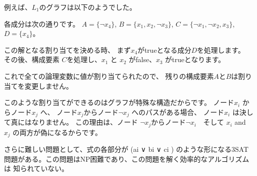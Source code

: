 例えば、$L_1$のグラフは以下のようでした。
\begin{center}
\end{center}

各成分は次の通りです。
$A = \{\lnot x_4\}$,
$B = \{x_1, x_2, \lnot x_3\}$,
$C = \{\lnot x_1, \lnot x_2, x_3\}$,
$D = \{x_4\}$。

この解となる割り当てを決める時、
まず$x_4$がtrueとなる成分$D$を処理します。
その後、構成要素 $C$を処理し、$x_1$ と $x_2$ がfalse、$x_3$ がtrueとなります。

これで全ての論理変数に値が割り当てられたので、
残りの構成要素$A$と$B$は割り当てを変更しません。

このような割り当てができるのはグラフが特殊な構造だからです。
ノード$x_i$  からノード$x_j$  へ、
ノード$x_j$からノード$\lnot x_j$ へのパスがある場合、
ノード$x_i$ は決して真にはなりません。
この理由は、ノード
 $\lnot x_j$からノード$\lnot x_i$　そして $x_i$ and $x_j$  の両方が偽になるからです。


さらに難しい問題として、式の各部分が (ai ∨ bi ∨ ci ) のような形になる3SAT
問題がある。この問題はNP困難であり、この問題を解く効率的なアルゴリズムは 知られていない。
